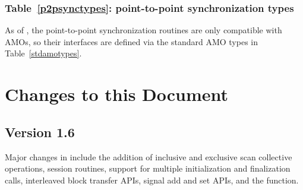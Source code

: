 \subsection{Table~\ref{p2psynctypes}: point-to-point synchronization types}
\label{dep:p2p_sync_types}
As of , the point-to-point synchronization routines are only
compatible with \acp{AMO}, so their interfaces are defined via the
standard \ac{AMO} types in Table~\ref{stdamotypes}.




\chapter{Changes to this Document}\label{sec:changelog}

\section{Version 1.6}
\label{changelog:v1.6}
Major changes in \openshmem[1.6] include the addition of inclusive and
exclusive scan collective operations, session routines, support for multiple
initialization and finalization calls, interleaved block transfer APIs,
signal add and set APIs, and the
 function.


